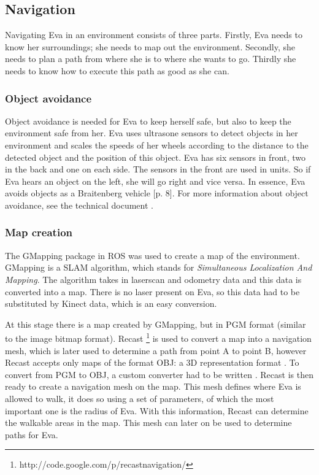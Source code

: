\documentclass[project_eva.tex]{subfiles}
\begin{document}
\subsection*{Navigation}
Navigating Eva in an environment consists of three parts. Firstly, Eva needs to know her surroundings; she needs to map out the environment. Secondly, she needs to plan a path from where she is to where she wants to go. Thirdly she needs to know how to execute this path as good as she can.

\subsubsection*{Object avoidance}
Object avoidance is needed for Eva to keep herself safe, but also to keep the environment safe from her. Eva uses ultrasone 
sensors to detect objects in her environment and scales the speeds of her wheels according to the distance to the 
detected object and the position of this object. Eva has six sensors in front, two in the back and one on each side. The 
sensors in the front are used in units. So if Eva hears an object on the left, she will go right and vice 
versa. In essence, Eva avoids objects as a Braitenberg vehicle \cite{braitenberg} [p. 8]. For more information about object avoidance, see the technical document\cite{Tech} .

\subsubsection*{Map creation}
The GMapping package in ROS was used to create a map of the environment. GMapping \cite{GMapping} is a SLAM algorithm, 
which stands for \textit{Simultaneous Localization And Mapping}. The algorithm takes in laserscan and odometry data and 
this data is converted into a map. There is no laser present on Eva, so this data had to be substituted by Kinect data, 
which is an easy conversion.

At this stage there is a map created by GMapping, but in PGM format (similar to the image bitmap format). Recast 
\footnote{http://code.google.com/p/recastnavigation/} is used to convert a map into a navigation mesh, which is later used to determine a path from point A to point B, however Recast accepts only maps of the format OBJ: a 3D representation 
format \cite{wavefront}. To convert from PGM to OBJ, a custom converter had to be written \cite{Tech} . Recast is then ready to create a navigation mesh on the map. This mesh defines where Eva is allowed to walk, it does so using a set of parameters, of which the most important one is the radius of Eva. With this information, Recast can determine the walkable areas in the map. This mesh can later on be used to determine paths for Eva.
\end{document}
